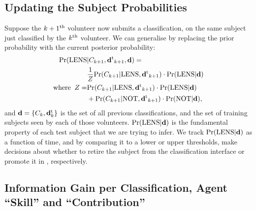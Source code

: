 \documentclass[useAMS,usenatbib,a4paper]{mn2e}
\begin{document}
\subsection{Updating the Subject Probabilities}
\label{appendix:swap:examples}

Suppose the $k+1^{\rm th}$ volunteer now submits a classification, on the same
subject just classified by the $k^{\rm th}$ volunteer. We can generalise
 by replacing the prior probability with the current
posterior probability:
\begin{align}
  \label{eq:app:update}
  {\rm Pr}({\rm LENS} & |C_{k+1},{\mathbf{d}^{\rm t}}_{k+1},{\mathbf{d}}) = \\
  & \frac{1}{Z} {\rm Pr}(C_{k+1}|{\rm LENS},{\mathbf{d}^{\rm t}}_{k+1}) \cdot {\rm Pr}({\rm LENS}|{\mathbf{d}}) \\ \notag
{\rm where}\;\; Z = & {\rm Pr}(C_{k+1}|{\rm LENS},{\mathbf{d}^{\rm t}}_{k+1})\cdot{\rm Pr}({\rm LENS}|{\mathbf{d}}) \\ \notag
      & + {\rm Pr}(C_{k+1}|{\rm NOT},{\mathbf{d}^{\rm t}}_{k+1})\cdot{\rm Pr}({\rm NOT}|{\mathbf{d}}), \notag
\end{align}
and ${\mathbf{d}} = \{C_k,{\mathbf{d}^{\rm t}_k}\}$ is the set of all previous
classifications, and the set of training subjects seen by each of those
volunteers.
${\rm Pr}({\rm LENS}|{\mathbf{d}})$ is the fundamental property of each test subject that
we are trying to infer. We track ${\rm Pr}({\rm LENS}|{\mathbf{d}})$ as a function of time,
and by comparing it to a lower or upper thresholds, make decisions about
whether to retire the subject from the classification interface or
promote it in \Talk, respectively.


\subsection{Information Gain per Classification, Agent ``Skill'' and ``Contribution''}
\label{appendix:swap:examples}
\end{document}
